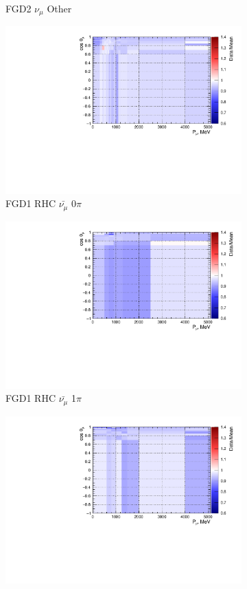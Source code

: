 \begin{figure}
\begin{subfigure}{.32\textwidth}
  \caption{FGD2 $\nu_{\mu}$ Other}
  \label{fig:priorpred_FGD2_numuCC_other}
\end{subfigure}
\centering
\begin{subfigure}{.32\textwidth}
  \centering
  \includegraphics[width=0.85\linewidth]{figs/priorpred_FGD1_anti-numuCC_0pi.pdf}
  \caption{FGD1 RHC $\bar{\nu_{\mu}}$ 0$\pi$}
  \label{fig:priorpred_FGD1_anti-numuCC_0pi}
\end{subfigure}
\begin{subfigure}{.32\textwidth}
  \centering
  \includegraphics[width=0.85\linewidth]{figs/priorpred_FGD1_anti-numuCC_1pi.pdf}
  \caption{FGD1 RHC $\bar{\nu_{\mu}}$ 1$\pi$}
  \label{fig:priorpred_FGD1_anti-numuCC_1pi}
\end{subfigure}
\begin{subfigure}{.32\textwidth}
  \centering
  \includegraphics[width=0.85\linewidth]{figs/priorpred_FGD1_anti-numuCC_other.pdf}

\end{subfigure}
\end{figure}
